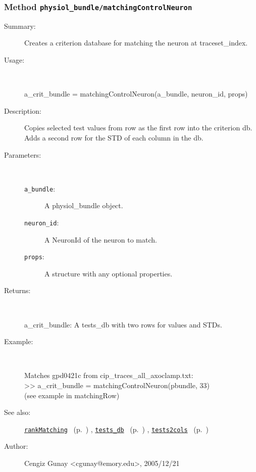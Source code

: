 \subsubsection[Method \texttt{matchingControlNeuron}]{Method \texttt{physiol\_bundle/matchingControlNeuron}}%
%
\label{ref_physiol_bundle__matchingControlNeuron}%
\hypertarget{ref_physiol_bundle__matchingControlNeuron}{}%
\begin{description}
\item[Summary:]Creates a criterion database for matching the neuron at traceset\_index.
%
\item[Usage:]~%
\begin{lyxcode}%
a\_crit\_bundle = matchingControlNeuron(a\_bundle, neuron\_id, props)
%
\end{lyxcode}%
%
\item[Description:]%
Copies selected test values from row as the first row into the 
 criterion db. Adds a second row for the STD of each column in the db.
\item[Parameters:]~
\begin{description}%
\item[\texttt{a\_bundle}:]
 A physiol\_bundle object.
\item[\texttt{neuron\_id}:]
 A NeuronId of the neuron to match.
\item[\texttt{props}:]
 A structure with any optional properties.
\end{description}%
%
\item[Returns:]~

	a\_crit\_bundle: A tests\_db with two rows for values and STDs.
%
\item[Example:]~
\begin{lyxcode}        Matches gpd0421c from cip\_traces\_all\_axoclamp.txt:\\%
        >> a\_crit\_bundle = matchingControlNeuron(pbundle, 33)\\%
        (see example in matchingRow)\\%
\end{lyxcode}
%
\item[See also:]%
\hyperlink{ref_rankMatching}{\texttt{rankMatching}}%
\ (p.~\pageref{ref_rankMatching})%
%
, \hyperlink{ref_tests_db}{\texttt{tests\_db}}%
\ (p.~\pageref{ref_tests_db})%
%
, \hyperlink{ref_tests2cols}{\texttt{tests2cols}}%
\ (p.~\pageref{ref_tests2cols})%
%
%
\item[Author:]%
Cengiz Gunay <cgunay@emory.edu>, 2005/12/21%
\end{description}
\methodline%
